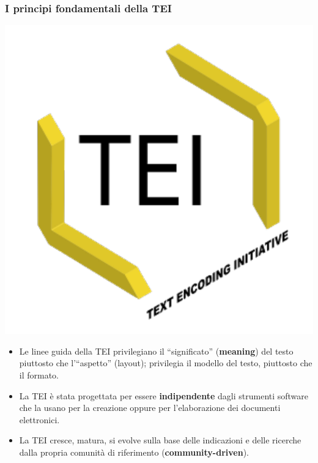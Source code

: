 \begin{frame}
	\frametitle{I principi fondamentali della TEI}
	\addtocounter{nframe}{1}
    
    \begin{center}
	    \includegraphics[width=.2\textwidth]{imgs/tei-r.pdf}
	\end{center}

    \begin{itemize}
        
        \item<1-> Le linee guida della TEI privilegiano il ``significato'' (\textbf{meaning}) del testo piuttosto che l'``aspetto'' (layout); privilegia il modello del testo, piuttosto che il formato.
          
        \item<2-> La TEI è stata progettata per essere \textbf{indipendente} dagli strumenti software che la usano per la creazione oppure per l'elaborazione dei documenti elettronici.

        \item<3-> La TEI cresce, matura, si evolve sulla base delle indicazioni e delle ricerche dalla propria comunità di riferimento (\textbf{community-driven}).
           
    \end{itemize}
    
\end{frame}







